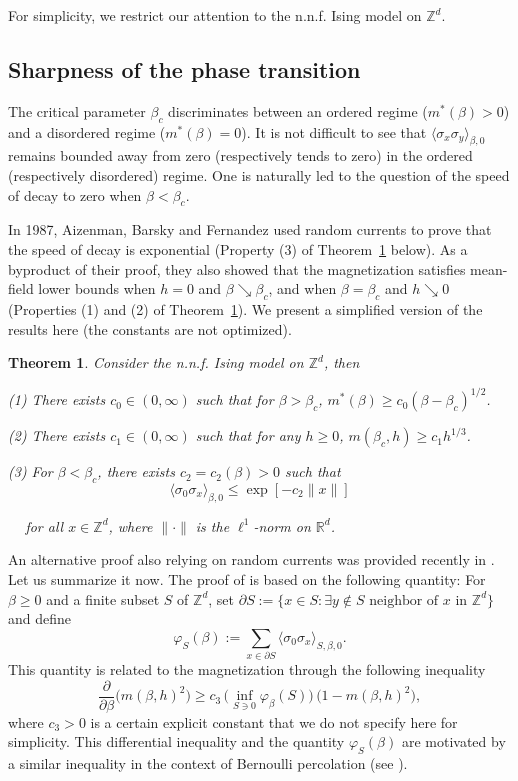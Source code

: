 \documentclass[a4paper,oneside,11pt]{article}
\newtheorem{theorem}{Theorem}[section]
\newcommand{\ee}{\end{equation}}
\newcommand{\be}{\begin{equation}}
\begin{document}
For simplicity, we restrict our attention to the n.n.f. Ising model on $\mathbb Z^d$.


\subsection{Sharpness of the phase transition}

The critical parameter $\beta_c$ discriminates between an ordered regime ($m^*(\beta)>0$) and a disordered regime ($m^*(\beta)=0$). It is not difficult to see that 
$\langle\sigma_x\sigma_y\rangle_{\beta,0}$ remains bounded away from zero (respectively tends to zero) in the ordered (respectively disordered) regime. One is naturally led to the question of the speed of decay to zero when $\beta<\beta_c$. 

In 1987, Aizenman, Barsky and Fernandez \cite{AizBarFer87} used random currents to prove that the speed of decay is exponential (Property (3) of Theorem~\ref{thm:1} below). As a byproduct of their proof, they also showed that the magnetization satisfies mean-field lower bounds when $h=0$ and $\beta\searrow \beta_c$, and when $\beta=\beta_c$ and $h\searrow 0$ (Properties (1) and (2) of Theorem~\ref{thm:1}). We present a simplified version of the results here (the constants are not optimized). 

\begin{theorem}\label{thm:1} Consider the n.n.f. Ising model on $\mathbb Z^d$, then

(1) There exists $c_0\in (0,\infty)$ such that for $\beta>\beta_c$, $m^*(\beta)\ge c_0(\beta-\beta_c)^{1/2}$.

(2) There exists $c_1\in(0,\infty)$ such that for any $h\ge0$, $m(\beta_c,h)\ge c_1h^{1/3}$.

(3) For $\beta<\beta_c$, there exists $c_2=c_2(\beta)>0$ such that $$\langle\sigma_0\sigma_x\rangle_{\beta,0}\le \exp[-c_2 \|x\|]$$

$\ \ \ \ $ for all 
 $x\in \mathbb Z^d$, where $\|\cdot\|$ is the $\ell^1$-norm on $\mathbb R^d$.
\end{theorem}

An alternative proof also relying on random currents was provided recently in \cite{DumTas15}. Let us summarize it now. The proof of \cite{DumTas15} is based on the following quantity:
 For $\beta\ge0$ and a finite subset $S$ of $\mathbb Z^d$, set 
$\partial S:=\{x\in S:\exists y\notin S\text{ neighbor of }x\text{ in }\mathbb Z^d\}$
 and define
\be\nonumber
\varphi_S(\beta):=\sum_{x\in \partial S}\langle \sigma_0\sigma_x\rangle_{S,\beta,0}.
\ee
 This quantity is related to the magnetization through the following inequality
\be\label{eq:diff}
\frac{\partial}{\partial\beta}\big(m(\beta,h)^2\big)\ge c_3\,\Big(\inf_{S\ni 0}\varphi_\beta(S)\Big)\,\big(1-m(\beta,h)^2\big),
\ee
where $c_3>0$ is a certain explicit constant that we do not specify here for simplicity.
This differential inequality and the quantity $\varphi_S(\beta)$ are motivated by a similar inequality in the context of Bernoulli percolation (see \cite[(1.1) and (1.3)]{DumTas15}).
\end{document}
